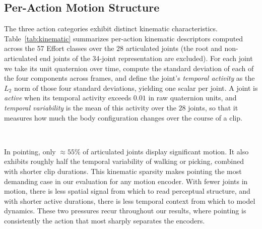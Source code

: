 \documentclass[letterpaper]{article} %
\begin{document}
\subsection{Per-Action Motion Structure}
\label{sec:peraction}
The three action categories exhibit distinct kinematic characteristics. Table~\ref{tab:kinematic} summarizes per-action
kinematic descriptors computed across the 57 Effort classes over the $28$ articulated joints (the root
and non-articulated end joints of the 34-joint representation are excluded). For each joint we take its
unit quaternion over time, compute the standard deviation of each of the four components across frames,
and define the joint's \emph{temporal activity} as the $L_2$ norm of those four standard deviations,
yielding one scalar per joint. A joint is \emph{active} when its temporal activity exceeds $0.01$ in
raw quaternion units, and \emph{temporal variability} is the mean of this activity over the $28$
joints, so that it measures how much the body configuration changes over the course of a clip.

\begin{table}[htbp]
\centering
\caption{Kinematic descriptors per action category (mean over 57 Effort classes).}
\setlength{\tabcolsep}{6pt}
\small
{}~\label{tab:kinematic}
\end{table}

In pointing, only $\approx 55\%$ of articulated joints display significant
motion. It also exhibits roughly half the temporal variability of walking or picking, combined with shorter clip durations.
This kinematic sparsity makes pointing the most demanding case in our evaluation for any motion encoder.  With fewer joints in
motion, there is less spatial signal from which to read perceptual structure, and with shorter active
durations, there is less temporal context from which to model dynamics. These two pressures recur
throughout our results, where pointing is consistently the action that most sharply separates the
encoders.
\end{document}
